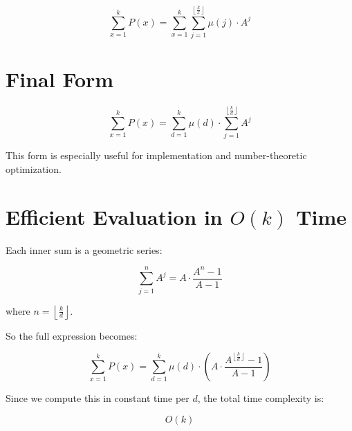\documentclass[12pt]{article}
\begin{document}
\[
\sum_{x=1}^{k} P(x) = \sum_{x=1}^{k} \sum_{j=1}^{\left\lfloor \frac{k}{x} \right\rfloor} \mu(j) \cdot A^j
\]

\section*{Final Form}

\[
\boxed{
\sum_{x=1}^{k} P(x) = \sum_{d=1}^{k} \mu(d) \cdot \sum_{j=1}^{\left\lfloor \frac{k}{d} \right\rfloor} A^j
}
\]

This form is especially useful for implementation and number-theoretic optimization.

\section*{Efficient Evaluation in $O(k)$ Time}

Each inner sum is a geometric series:

\[
\sum_{j=1}^{n} A^j = A \cdot \frac{A^n - 1}{A - 1}
\]

where $n = \left\lfloor \frac{k}{d} \right\rfloor$.

So the full expression becomes:

\[
\sum_{x=1}^{k} P(x) = \sum_{d=1}^{k} \mu(d) \cdot \left( A \cdot \frac{A^{\left\lfloor \frac{k}{d} \right\rfloor} - 1}{A - 1} \right)
\]

Since we compute this in constant time per $d$, the total time complexity is:

\[
\boxed{O(k)}
\]
\end{document}
